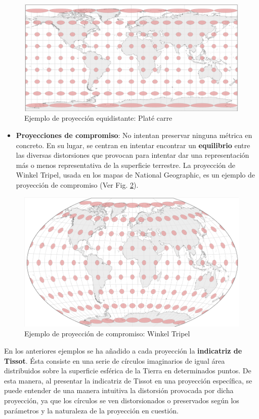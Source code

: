 \documentclass[
]{book}
\providecommand{\tightlist}{%
  \setlength{\itemsep}{0pt}\setlength{\parskip}{0pt}}
\theoremstyle{definition}
\theoremstyle{definition}
\theoremstyle{definition}
\theoremstyle{definition}
\theoremstyle{remark}
\begin{document}
\begin{figure}

{\centering \includegraphics[width=0.3\linewidth]{img/equidist} 

}

\caption{Ejemplo de proyección equidistante: Platé carre}\label{fig:equidist}
\end{figure}

\begin{itemize}
\tightlist
\item
  \textbf{Proyecciones de compromiso}: No intentan preservar ninguna métrica en
  concreto. En su lugar, se centran en intentar encontrar un \textbf{equilibrio}
  entre las diversas distorsiones que provocan para intentar dar una
  representación más o menos representativa de la superficie terrestre. La
  proyección de Winkel Tripel, usada en los mapas de National Geographic, es
  un ejemplo de proyección de compromiso (Ver Fig. \ref{fig:comp}).
\end{itemize}

\begin{figure}

{\centering \includegraphics[width=0.3\linewidth]{img/comp} 

}

\caption{Ejemplo de proyección de compromiso: Winkel Tripel}\label{fig:comp}
\end{figure}

En los anteriores ejemplos se ha añadido a cada proyección la \textbf{indicatriz de
Tissot}. Ésta consiste en una serie de círculos imaginarios de igual área
distribuidos sobre la superficie esférica de la Tierra en determinados puntos.
De esta manera, al presentar la indicatriz de Tissot en una proyección
específica, se puede entender de una manera intuitiva la distorsión provocada
por dicha proyección, ya que los círculos se ven distorsionados o preservados
según los parámetros y la naturaleza de la proyección en cuestión.

  
\end{document}
